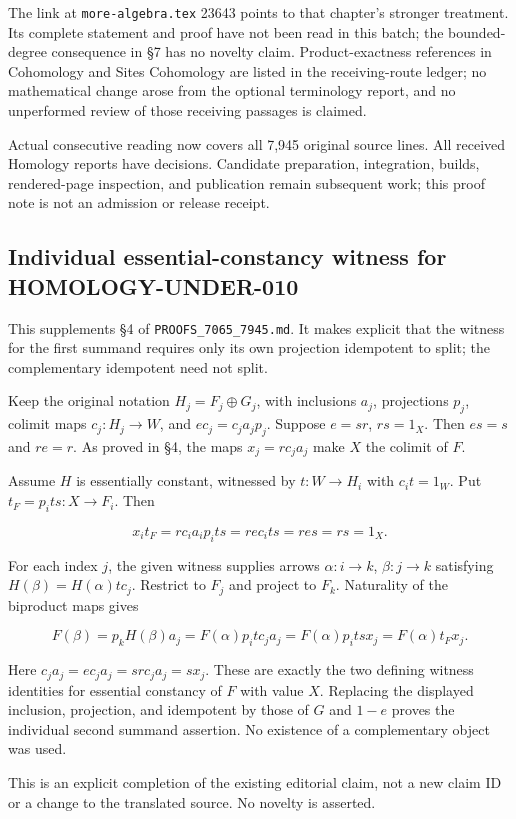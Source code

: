 \documentclass[11pt]{article}
\begin{document}
The link at \texttt{more-algebra.tex} 23643 points to that chapter's stronger treatment. Its complete statement and proof have not been read in this batch; the bounded-degree consequence in §7 has no novelty claim. Product-exactness references in Cohomology and Sites Cohomology are listed in the receiving-route ledger; no mathematical change arose from the optional terminology report, and no unperformed review of those receiving passages is claimed.

Actual consecutive reading now covers all 7,945 original source lines. All received Homology reports have decisions. Candidate preparation, integration, builds, rendered-page inspection, and publication remain subsequent work; this proof note is not an admission or release receipt.
\clearpage
\subsection{Individual essential-constancy witness for HOMOLOGY-UNDER-010}\label{individual-essential-constancy-witness-for-homology-under-010}

This supplements §4 of \texttt{PROOFS\_7065\_7945.md}. It makes explicit that the witness for the first summand requires only its own projection idempotent to split; the complementary idempotent need not split.

Keep the original notation \(H_j=F_j\oplus G_j\), with inclusions \(a_j\), projections \(p_j\), colimit maps \(c_j:H_j\to W\), and \(e c_j=c_j a_jp_j\). Suppose \(e=sr\), \(rs=1_X\). Then \(es=s\) and \(re=r\). As proved in §4, the maps \(x_j=rc_ja_j\) make \(X\) the colimit of \(F\).

Assume \(H\) is essentially constant, witnessed by \(t:W\to H_i\) with \(c_i t=1_W\). Put \(t_F=p_i t s:X\to F_i\). Then

\[
x_i t_F=r c_i a_i p_i t s
       =r e c_i t s=r e s=rs=1_X.
\]

For each index \(j\), the given witness supplies arrows \(\alpha:i\to k\), \(\beta:j\to k\) satisfying \(H(\beta)=H(\alpha)t c_j\). Restrict to \(F_j\) and project to \(F_k\). Naturality of the biproduct maps gives

\[
F(\beta)=p_kH(\beta)a_j
=F(\alpha)p_i t c_j a_j
=F(\alpha)p_i t s x_j
=F(\alpha)t_F x_j.
\]

Here \(c_j a_j=e c_j a_j=s r c_j a_j=sx_j\). These are exactly the two defining witness identities for essential constancy of \(F\) with value \(X\). Replacing the displayed inclusion, projection, and idempotent by those of \(G\) and \(1-e\) proves the individual second summand assertion. No existence of a complementary object was used.

This is an explicit completion of the existing editorial claim, not a new claim ID or a change to the translated source. No novelty is asserted.
\clearpage
\end{document}
